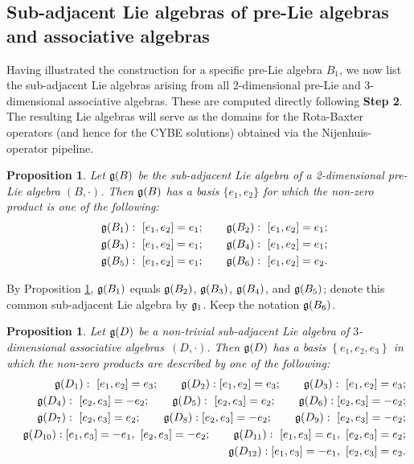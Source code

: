 \documentclass[12pt, reqno]{amsart}
\theoremstyle{plain}
\newtheorem{proposition}[theorem]{Proposition}
\begin{document}
\subsection{Sub-adjacent Lie algebras of  pre-Lie algebras and associative algebras}
Having illustrated the construction for a specific pre-Lie algebra $B_1$, we now list the sub-adjacent Lie algebras arising from all 2-dimensional pre-Lie and 3-dimensional associative algebras. These are computed directly following \textbf{Step 2}. The resulting Lie algebras will serve as the domains for the Rota-Baxter operators (and hence for the CYBE solutions) obtained via the Nijenhuis-operator pipeline.


\begin{proposition}\label{sub lie 2}
Let $ {\frak g}(B) $ be the sub-adjacent Lie algebra of a 2-dimensional pre-Lie algebra $ (B, \cdot) $. Then $ {\frak g}(B) $ has a basis $ \{e_1, e_2\} $ for which the non-zero product is one of the following:
\begin{eqnarray*}
  && {\frak g}(B_1):~[e_1,e_2]=e_1;\quad\quad{\frak g}(B_2):~[e_1,e_2]=e_1; \\
  && {\frak g}(B_3):~[e_1,e_2]=e_1;\quad\quad{\frak g}(B_4):~[e_1,e_2]=e_1; \\
  && {\frak g}(B_5):~[e_1,e_2]=e_1;\quad\quad{\frak g}(B_6):~[e_1,e_2]=e_2.
\end{eqnarray*}
\end{proposition}

By Proposition \ref{sub lie 2}, ${\frak g}(B_1)$ equals ${\frak g}(B_2)$, ${\frak g}(B_3)$, ${\frak g}(B_4)$, and ${\frak g}(B_5)$; denote this common sub-adjacent Lie algebra by ${\frak g_1}$. Keep the notation ${\frak g}(B_6)$.

\begin{proposition}\label{sub lie 3}
Let ${\frak g}(D)$ be a non-trivial sub-adjacent Lie algebra of $3$-dimensional associative algebras~$(D,\cdot)$. Then ${\frak g}(D)$ has a basis $\left\{e_{1}, e_{2},e_{3}\right\}$ in which the non-zero products are described by one of the following:
\begin{eqnarray*}
  &&{\frak g}(D_1):~[e_1,e_2]=e_3;\quad\quad{\frak g}(D_2):[e_1,e_2]=e_3;\quad\quad{\frak g}(D_3):~[e_1,e_2]=e_3;\\
  && {\frak g}(D_4):~ [e_2,e_3]=-e_2;\quad\quad{\frak g}(D_5):~[e_2,e_3]=e_2;\quad\quad{\frak g}(D_6): [e_2,e_3]=-e_2; \\
  && {\frak g}(D_7): ~[e_2,e_3]=e_2;\quad\quad{\frak g}(D_8): [e_2,e_3]=-e_2;\quad\quad{\frak g}(D_9):~[e_2,e_3]=-e_2;\\
  &&{\frak g}(D_{10}): [e_1,e_3]=-e_1,~[e_2,e_3]=-e_2;\quad\quad{\frak g}(D_{11}): ~[e_1,e_3]=e_1,~[e_2,e_3]=e_2;\\
  &&{\frak g}(D_{12}): [e_1,e_3]=-e_1,~[e_2,e_3]=e_2.
\end{eqnarray*}
\end{proposition}
\end{document}
